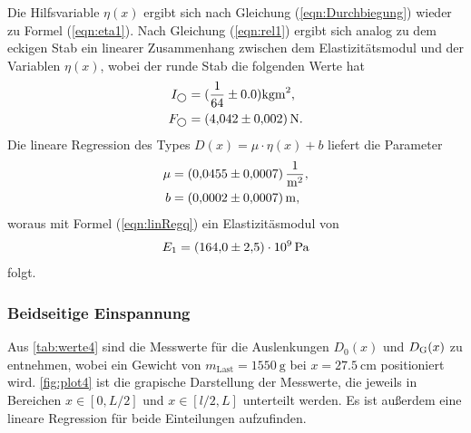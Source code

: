\sloppy
Die Hilfsvariable $\eta(x)$ ergibt sich nach Gleichung (\ref{eqn:Durchbiegung}) wieder zu Formel (\ref{eqn:eta1}).
Nach Gleichung (\ref{eqn:rel1}) ergibt sich analog zu dem eckigen Stab ein linearer Zusammenhang zwischen dem Elastizitätsmodul und
der Variablen $\eta(x)$, wobei der runde Stab die folgenden Werte hat
\begin{align*}
  I_{\bigcirc} &= (\frac{1}{64} \pm 0.0) \si{\kilo\gram\meter^2}, \\
  F_{\bigcirc} &= \SI{4.042 (0.002)}{\newton}. \\
\end{align*}
Die lineare Regression des Types $D(x) = \mu\cdot\eta(x)+b$ liefert die Parameter
\begin{align*}
  \mu &= \SI{0.0455 (0.0007)}{\per\square\meter},\\
  b &= \SI{0.0002 (0.0007)}{\meter}, \\
\end{align*}
woraus mit Formel (\ref{eqn:linRegq}) ein Elastizitäsmodul von
\begin{align*}
  E_1 = \SI{164 (2.5)e9}{\Pa}
\end{align*}
folgt.


\subsubsection{Beidseitige Einspannung}
\label{subsubsec:rundBeidEins}
Aus \autoref{tab:werte4} sind die Messwerte für die Auslenkungen $D_0(x)$ und $D_{\text G}(x)$ zu entnehmen, wobei ein Gewicht von
$m_{\text{Last}}=\SI{1550}{\gram}$ bei $x=\SI{27.5}{\cm}$ positioniert wird. \autoref{fig:plot4} ist die grapische Darstellung der Messwerte, die 
jeweils in Bereichen $x \in [0, L/2] $ und 
$x \in [l/2,L]$ unterteilt werden. Es ist außerdem eine lineare Regression für beide Einteilungen
aufzufinden.

